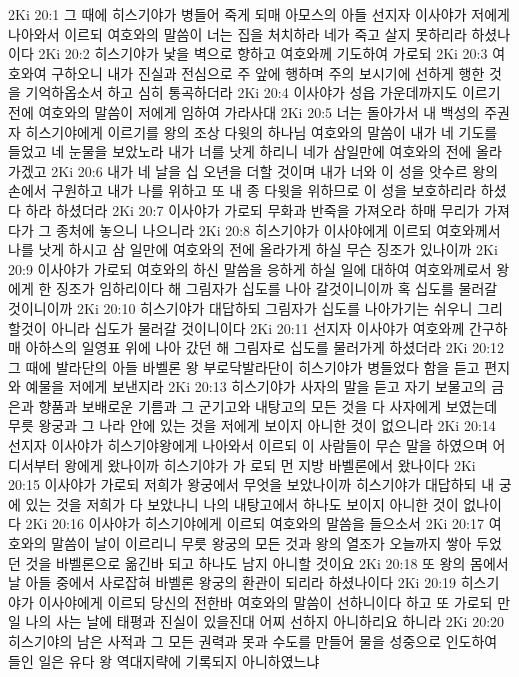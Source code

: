 2Ki 20:1  그 때에 히스기야가 병들어 죽게 되매 아모스의 아들 선지자 이사야가 저에게 나아와서 이르되 여호와의 말씀이 너는 집을 처치하라 네가 죽고 살지 못하리라 하셨나이다
2Ki 20:2  히스기야가 낯을 벽으로 향하고 여호와께 기도하여 가로되
2Ki 20:3  여호와여 구하오니 내가 진실과 전심으로 주 앞에 행하며 주의 보시기에 선하게 행한 것을 기억하옵소서 하고 심히 통곡하더라
2Ki 20:4  이사야가 성읍 가운데까지도 이르기 전에 여호와의 말씀이 저에게 임하여 가라사대
2Ki 20:5  너는 돌아가서 내 백성의 주권자 히스기야에게 이르기를 왕의 조상 다윗의 하나님 여호와의 말씀이 내가 네 기도를 들었고 네 눈물을 보았노라 내가 너를 낫게 하리니 네가 삼일만에 여호와의 전에 올라가겠고
2Ki 20:6  내가 네 날을 십 오년을 더할 것이며 내가 너와 이 성을 앗수르 왕의 손에서 구원하고 내가 나를 위하고 또 내 종 다윗을 위하므로 이 성을 보호하리라 하셨다 하라 하셨더라
2Ki 20:7  이사야가 가로되 무화과 반죽을 가져오라 하매 무리가 가져다가 그 종처에 놓으니 나으니라
2Ki 20:8  히스기야가 이사야에게 이르되 여호와께서 나를 낫게 하시고 삼 일만에 여호와의 전에 올라가게 하실 무슨 징조가 있나이까
2Ki 20:9  이사야가 가로되 여호와의 하신 말씀을 응하게 하실 일에 대하여 여호와께로서 왕에게 한 징조가 임하리이다 해 그림자가 십도를 나아 갈것이니이까 혹 십도를 물러갈 것이니이까
2Ki 20:10  히스기야가 대답하되 그림자가 십도를 나아가기는 쉬우니 그리할것이 아니라 십도가 물러갈 것이니이다
2Ki 20:11  선지자 이사야가 여호와께 간구하매 아하스의 일영표 위에 나아 갔던 해 그림자로 십도를 물러가게 하셨더라
2Ki 20:12  그 때에 발라단의 아들 바벨론 왕 부로닥발라단이 히스기야가 병들었다 함을 듣고 편지와 예물을 저에게 보낸지라
2Ki 20:13  히스기야가 사자의 말을 듣고 자기 보물고의 금은과 향품과 보배로운 기름과 그 군기고와 내탕고의 모든 것을 다 사자에게 보였는데 무릇 왕궁과 그 나라 안에 있는 것을 저에게 보이지 아니한 것이 없으니라
2Ki 20:14  선지자 이사야가 히스기야왕에게 나아와서 이르되 이 사람들이 무슨 말을 하였으며 어디서부터 왕에게 왔나이까 히스기야가 가 로되 먼 지방 바벨론에서 왔나이다
2Ki 20:15  이사야가 가로되 저희가 왕궁에서 무엇을 보았나이까 히스기야가 대답하되 내 궁에 있는 것을 저희가 다 보았나니 나의 내탕고에서 하나도 보이지 아니한 것이 없나이다
2Ki 20:16  이사야가 히스기야에게 이르되 여호와의 말씀을 들으소서
2Ki 20:17  여호와의 말씀이 날이 이르리니 무릇 왕궁의 모든 것과 왕의 열조가 오늘까지 쌓아 두었던 것을 바벨론으로 옮긴바 되고 하나도 남지 아니할 것이요
2Ki 20:18  또 왕의 몸에서 날 아들 중에서 사로잡혀 바벨론 왕궁의 환관이 되리라 하셨나이다
2Ki 20:19  히스기야가 이사야에게 이르되 당신의 전한바 여호와의 말씀이 선하니이다 하고 또 가로되 만일 나의 사는 날에 태평과 진실이 있을진대 어찌 선하지 아니하리요 하니라
2Ki 20:20  히스기야의 남은 사적과 그 모든 권력과 못과 수도를 만들어 물을 성중으로 인도하여 들인 일은 유다 왕 역대지략에 기록되지 아니하였느냐
